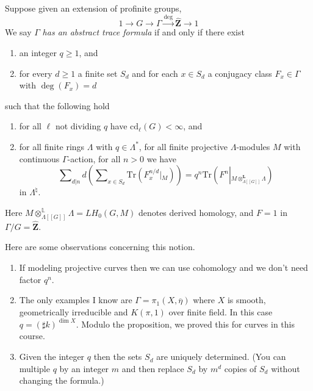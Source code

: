 \noindent
Suppose given an extension of profinite groups,
$$
1 \to G \to \Gamma \xrightarrow{\deg} \widehat{\mathbf{Z}} \to 1
$$
We say $\Gamma$ {\it has an abstract trace formula} if and only if
there exist
\begin{enumerate}
\item an integer $q\geq 1$, and
\item for every $d\geq 1$ a finite set $S_d$ and for each $x\in S_d$ a
conjugacy class $F_x \in \Gamma$ with $\deg(F_x) = d$
\end{enumerate}
such that the following hold
\begin{enumerate}
\item for all $\ell$ not dividing $q$ have $\text{cd}_\ell(G)<\infty$, and
\item for all finite rings $\Lambda$ with $q\in \Lambda^*$,
for all finite projective $\Lambda$-modules $M$ with continuous
$\Gamma$-action, for all $n>0$ we have
$$
\sum\nolimits_{d|n}d \left(
\sum\nolimits_{x \in S_d}
\text{Tr}( F_x^{n/d} \left|_M\right.)
\right)
=
q^n \text{Tr}( F^n\left|_{M\otimes_{\Lambda[[G]]}^{\mathbf{L}}\Lambda}\right.)
$$
in $\Lambda^\natural$.
\end{enumerate}
Here $M\otimes_{\Lambda[[G]]}^{\mathbb L}\Lambda = LH_0(G, M)$ denotes
derived homology, and $F=1$ in $\Gamma/G = \widehat{\mathbf{Z}}$.

\begin{remark}
\label{remark-abstract-trace-formula}
Here are some observations concerning this notion.
\begin{enumerate}
\item If modeling projective curves then we can use cohomology and we
don't need factor $q^n$.
\item The only examples I know are $\Gamma=\pi_1(X, \overline \eta)$
where $X$ is smooth, geometrically irreducible and $K(\pi, 1)$ over finite
field. In this case $q=(\sharp k)^{\dim X}$. Modulo the proposition, we proved
this for curves in this course.
\item Given the integer $q$ then the sets $S_d$ are uniquely
determined. (You can multiple $q$ by an integer $m$ and then replace $S_d$ by
$m^d$ copies of $S_d$ without changing the formula.)
\end{enumerate}
\end{remark}

